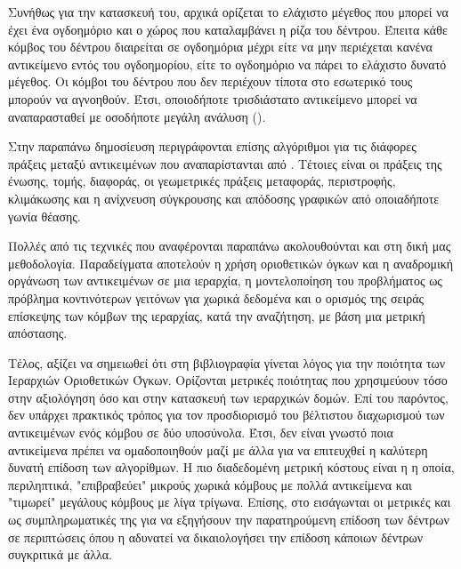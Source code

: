 \begin{itemize}
    Συνήθως για την κατασκευή του, αρχικά ορίζεται το ελάχιστο μέγεθος που μπορεί να 
    έχει ένα ογδοημόριο και ο χώρος που καταλαμβάνει η ρίζα του δέντρου. 
    Έπειτα κάθε κόμβος του  δέντρου 
    διαιρείται σε ογδοημόρια μέχρι είτε να μην περιέχεται κανένα αντικείμενο 
    εντός του ογδοημορίου, είτε το ογδοημόριο να πάρει το ελάχιστο δυνατό μέγεθος.
    Οι κόμβοι του δέντρου που δεν περιέχουν τίποτα στο εσωτερικό τους μπορούν να αγνοηθούν.
    Έτσι, οποιοδήποτε τρισδιάστατο αντικείμενο μπορεί να αναπαρασταθεί με οσοδήποτε 
    μεγάλη ανάλυση ().

    Στην παραπάνω δημοσίευση περιγράφονται επίσης αλγόριθμοι για τις διάφορες 
    πράξεις μεταξύ αντικειμένων που αναπαρίστανται από .
    Τέτοιες είναι οι πράξεις της ένωσης, τομής, διαφοράς, οι γεωμετρικές πράξεις 
    μεταφοράς, περιστροφής, κλιμάκωσης και η ανίχνευση σύγκρουσης και απόδοσης γραφικών 
    από οποιαδήποτε γωνία θέασης. 
\end{itemize}

Πολλές από τις τεχνικές που αναφέρονται παραπάνω ακολουθούνται και 
στη δική μας μεθοδολογία.
Παραδείγματα αποτελούν η χρήση οριοθετικών όγκων και η αναδρομική οργάνωση 
των αντικειμένων σε μια ιεραρχία, η μοντελοποίηση του προβλήματος 
ως πρόβλημα κοντινότερων γειτόνων για χωρικά δεδομένα και ο 
ορισμός της σειράς επίσκεψης των κόμβων της ιεραρχίας, κατά την αναζήτηση, με 
βάση μια μετρική απόστασης.

Τέλος, αξίζει να σημειωθεί ότι στη βιβλιογραφία γίνεται λόγος για την 
ποιότητα των Ιεραρχιών Οριοθετικών Όγκων. 
Ορίζονται μετρικές ποιότητας που χρησιμεύουν τόσο στην αξιολόγηση όσο 
και στην κατασκευή των ιεραρχικών δομών.
Επί του παρόντος, δεν υπάρχει πρακτικός τρόπος για τον προσδιορισμό 
του βέλτιστου διαχωρισμού των αντικειμένων ενός κόμβου σε δύο υποσύνολα.
Έτσι, δεν είναι γνωστό ποια αντικείμενα πρέπει να ομαδοποιηθούν μαζί
με άλλα για να επιτευχθεί η καλύτερη δυνατή επίδοση των αλγορίθμων.
Η πιο διαδεδομένη μετρική κόστους είναι η 
\textit{} 
\cite{goldsmith1987automatic} \cite{macdonald1990heuristics}
η οποία, περιληπτικά, "επιβραβεύει" μικρούς χωρικά κόμβους με πολλά 
αντικείμενα και "τιμωρεί" μεγάλους κόμβους με λίγα τρίγωνα. 
Επίσης, στο \cite{aila2013quality} εισάγωνται οι μετρικές 
 και 
 ως συμπληρωματικές 
της  για να εξηγήσουν την παρατηρούμενη επίδοση 
των δέντρων σε περιπτώσεις όπου η  αδυνατεί να 
δικαιολογήσει την επίδοση κάποιων δέντρων συγκριτικά 
με άλλα.

